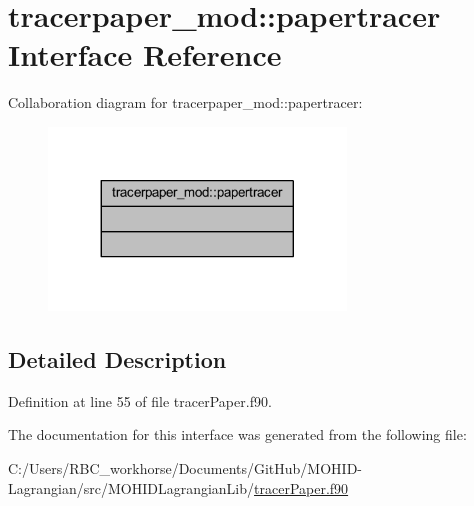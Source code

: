 \hypertarget{interfacetracerpaper__mod_1_1papertracer}{}\section{tracerpaper\+\_\+mod\+:\+:papertracer Interface Reference}
\label{interfacetracerpaper__mod_1_1papertracer}


Collaboration diagram for tracerpaper\+\_\+mod\+:\+:papertracer\+:\nopagebreak
\begin{figure}[H]
\begin{center}
\leavevmode
\includegraphics[width=224pt]{interfacetracerpaper__mod_1_1papertracer__coll__graph}
\end{center}
\end{figure}


\subsection{Detailed Description}


Definition at line 55 of file tracer\+Paper.\+f90.



The documentation for this interface was generated from the following file\+:\begin{DoxyCompactItemize}
\item 
C\+:/\+Users/\+R\+B\+C\+\_\+workhorse/\+Documents/\+Git\+Hub/\+M\+O\+H\+I\+D-\/\+Lagrangian/src/\+M\+O\+H\+I\+D\+Lagrangian\+Lib/\mbox{\hyperlink{tracer_paper_8f90}{tracer\+Paper.\+f90}}\end{DoxyCompactItemize}
